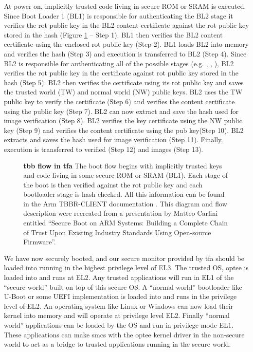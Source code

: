 At power on, implicitly trusted code living in secure ROM or SRAM is executed. Since Boot Loader 1 (BL1) is responsible for authenticating the BL2 stage it verifies the \gls{rot} public key in the BL2 content certificate against the \gls{rot} public key stored in the hash (Figure \ref{fig:tz-measure} -- Step 1). BL1 then verifies the BL2 content certificate using the enclosed \gls{rot} public key (Step 2). BL1 loads BL2 into memory and verifies the hash (Step 3) and execution is transferred to BL2 (Step 4). Since BL2 is responsible for authenticating all of the possible \bltx stages (e.g. \blto, \blttw, \bltt), BL2 verifies the \gls{rot} public key in the certificate against \gls{rot} public key stored in the hash (Step 5). BL2 then verifies the certificate using its \gls{rot} public key and saves the trusted world (TW) and normal world (NW) public keys. BL2 uses the TW public key to verify the \bltx certificate (Step 6) and verifies the \bltx content certificate using the \bltx public key (Step 7). BL2 can now extract and save the \bltx hash used for \bltx image verification (Step 8). BL2 verifies the \bltt key certificate using the NW public key (Step 9) and verifies the \bltt content certificate using the \bltt pub key(Step 10). BL2 extracts and saves the \bltt hash used for \bltt image verification (Step 11). Finally, execution is transferred to verified \bltx (Step 12) and \bltt images (Step 13).

\begin{figure}[hp]
\centering

\caption[Arm Trusted Firmware Trusted Board Boot]{\textbf{\gls{tbb} flow in \gls{tfa}} The boot flow begins with implicitly trusted keys and code living in some secure ROM or SRAM (BL1). Each stage of the boot is then verified against the \gls{rot} public key and each bootloader stage is hash checked. All this information can be found in the Arm TBBR-CLIENT documentation \cite{ArmTrustedBoot}. This diagram and flow description were recreated from a presentation by Matteo Carlini entitled ``Secure Boot on ARM Systems: Building a Complete Chain of Trust Upon Existing Industry Standards Using Open-source Firmware''.}
\label{fig:tz-measure}
\end{figure}

We have now securely booted, and our secure monitor provided by \gls{tfa} should be loaded into \blto running in the highest privilege level of EL3. The trusted OS, \gls{optee} is loaded into \blttw and runs at EL2. Any trusted applications will run in EL1 of the ``secure world'' built on top of this secure OS. A ``normal world'' bootloader like U-Boot or some UEFI implementation is loaded into \bltt and runs in the privilege level of EL2. An operating system like Linux or Windows can now load their kernel into memory and will operate at privilege level EL2.  Finally ``normal world'' applications can be loaded by the OS and run in privilege mode EL1. These applications can make \glspl{smc} with the \gls{optee} kernel driver in the non-secure world to act as a bridge to trusted applications running in the secure world.

